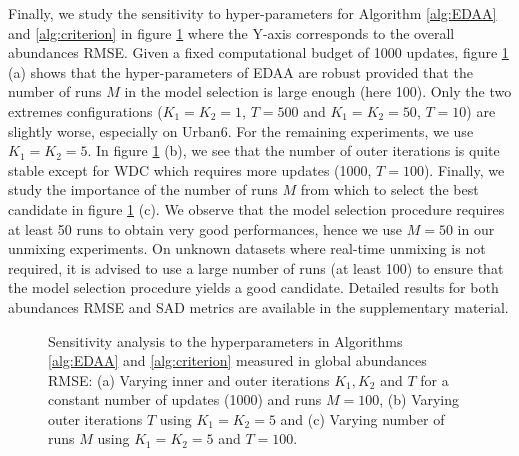Finally, we study the sensitivity to hyper-parameters for Algorithm \ref{alg:EDAA} and
\ref{alg:criterion} in figure \ref{fig:ablation} where the Y-axis corresponds to the
overall abundances RMSE.
Given a fixed computational budget of 1000 updates, figure \ref{fig:ablation}
(a) shows that the hyper-parameters of EDAA are robust provided that the number
of runs $M$ in the model selection is large enough (here 100). Only the two extremes
configurations ($K_1=K_2=1$, $T=500$ and $K_1=K_2=50$, $T=10$) are slightly
worse, especially on Urban6.
For the remaining experiments, we use $K_1=K_2=5$.
In figure \ref{fig:ablation} (b), we see that the number of outer iterations is
quite stable except for WDC which requires more updates (1000, \ie $T=100$).
Finally, we study the importance of the number of runs $M$ from which to select
the best candidate in figure \ref{fig:ablation} (c).
We observe that the model selection procedure requires at least 50 runs to
obtain very good performances, hence we use $M=50$ in our unmixing experiments.
On unknown datasets where real-time unmixing is not required, it is advised to
use a large number of runs (at least 100) to ensure that the model selection
procedure yields a good candidate.
Detailed results for both abundances RMSE and SAD metrics are available in the
supplementary material.

\begin{figure}[]
  \centering
  \hfil
  \hfil
  \caption{Sensitivity analysis to the hyperparameters in Algorithms
    \ref{alg:EDAA} and \ref{alg:criterion} measured in global abundances RMSE: (a) Varying
  inner and outer iterations $K_1, K_2$ and $T$ for a constant number of updates
  (1000) and runs $M=100$, (b) Varying
outer iterations $T$ using $K_1=K_2=5$ and (c) Varying number of runs $M$ using
$K_1=K_2=5$ and $T=100$.}
  \label{fig:ablation}
\end{figure}

